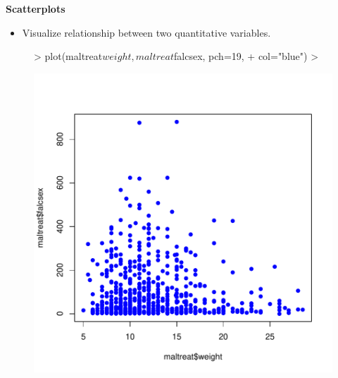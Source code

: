 \documentclass[xcolor=dvipsnames]{beamer}
\begin{document}
\begin{frame}[fragile]{\textbf{Scatterplots}}
\begin{itemize}
\item Visualize relationship between two quantitative variables.\vspace{0.3cm}
\end{itemize}
\begin{center}
\begin{figure}
\centering
\begin{Schunk}
\begin{Sinput}
> plot(maltreat$weight,maltreat$falcsex, pch=19, 
+      col="blue")
> 
\end{Sinput}
\end{Schunk}
\includegraphics{lesson3_graphs_presentation-005}
\end{figure}
\end{center}



\end{frame}
\end{document}
